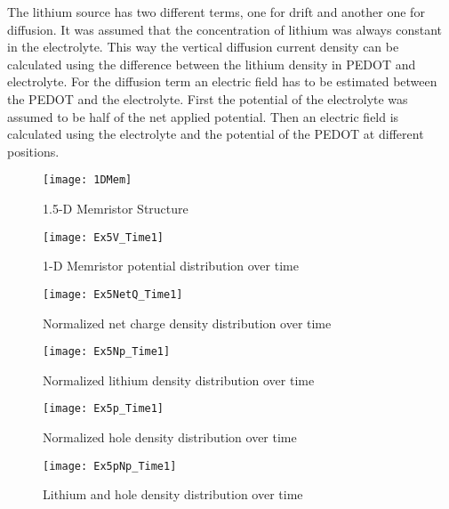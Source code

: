 The lithium source has two different terms, one for drift and another one for diffusion. It was assumed that the concentration of lithium was always constant in the electrolyte. This way the vertical diffusion current density can be calculated using the difference between the lithium density in PEDOT and electrolyte. For the diffusion term an electric field has to be estimated between the PEDOT and the electrolyte. First the potential of the electrolyte was assumed to be half of the net applied potential. Then an electric field is calculated using the electrolyte and the potential of the PEDOT at different positions.
  
\begin{figure}[!htp]
\centering
\texttt{[image: 1DMem]}
\caption{1.5-D Memristor Structure} 
\label{MemStc15}
\end{figure}


\begin{landscape}
\begin{figure}[!htp]
\centering
\texttt{[image: Ex5V\_Time1]}
\caption{1-D Memristor potential distribution over time} 
\label{}
\end{figure}
\end{landscape}


\begin{landscape}
\begin{figure}[!htp]
\centering
\texttt{[image: Ex5NetQ\_Time1]}
\caption{Normalized net charge density distribution over time} 
\label{}
\end{figure}
\end{landscape}


\begin{landscape}
\begin{figure}[!htp]
\centering
\texttt{[image: Ex5Np\_Time1]}
\caption{Normalized lithium density distribution over time} 
\label{}
\end{figure}
\end{landscape}


\begin{landscape}
\begin{figure}[!htp]
\centering
\texttt{[image: Ex5p\_Time1]}
\caption{Normalized hole density distribution over time} 
\label{}
\end{figure}
\end{landscape}

\begin{landscape}
\begin{figure}[!htp]
\centering
\texttt{[image: Ex5pNp\_Time1]}
\caption{Lithium and hole density distribution over time} 
\label{}
\end{figure}
\end{landscape}




